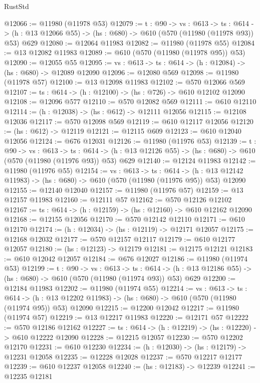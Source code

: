\begin{lexlean}{RustStd}
\begin{coremodule}
@12066 := @11980 (@11978 @53)
@12079 := {t : @90} ->
  {vs : @613} ->
  {ts : @614} -> (h : @13 @12066 @55) -> (hs : @680) -> @610 (@570 (@11980 (@11978 @93)) @53) @629
@12080 := @12064 @11983
@12082 := @11980 (@11978 @55)
@12084 := @13 @12082 @11983
@12089 := @610 (@570 (@11980 (@11978 @95)) @53)
@12090 := @12055 @55
@12095 := {vs : @613} -> {ts : @614} -> (h : @12084) -> (hs : @680) -> @12089 @12090
@12096 := @12080 @569
@12098 := @11980 (@11978 @57)
@12100 := @13 @12098 @11983
@12102 := @570 @12066 @569
@12107 := {ts : @614} -> (h : @12100) -> (hs : @726) -> @610 @12102 @12090
@12108 := @12096 @577
@12110 := @570 @12082 @569
@12111 := @610 @12110
@12114 := (h : @12038) -> (hs : @612) -> @12111 @12056
@12115 := @12108 @12036
@12117 := @570 @12098 @569
@12119 := @610 @12117 @12056
@12120 := (hs : @612) -> @12119
@12121 := @12115 @609
@12123 := @610 @12040 @12056
@12124 := @676 @12031
@12126 := @11980 (@11976 @53)
@12139 := {t : @90} ->
  {vs : @613} ->
  {ts : @614} -> (h : @13 @12126 @55) -> (hs : @680) -> @610 (@570 (@11980 (@11976 @93)) @53) @629
@12140 := @12124 @11983
@12142 := @11980 (@11976 @55)
@12154 := {vs : @613} ->
  {ts : @614} ->
  (h : @13 @12142 @11983) -> (hs : @680) -> @610 (@570 (@11980 (@11976 @95)) @53) @12090
@12155 := @12140 @12040
@12157 := @11980 (@11976 @57)
@12159 := @13 @12157 @11983
@12160 := @12111 @57
@12162 := @570 @12126 @12102
@12167 := {ts : @614} -> (h : @12159) -> (hs : @12160) -> @610 @12162 @12090
@12168 := @12155 @12056
@12170 := @570 @12142 @12110
@12171 := @610 @12170
@12174 := (h : @12034) -> (hs : @12119) -> @12171 @12057
@12175 := @12168 @12032
@12177 := @570 @12157 @12117
@12179 := @610 @12177 @12057
@12180 := (hs : @12123) -> @12179
@12181 := @12175 @12121
@12183 := @610 @12042 @12057
@12184 := @676 @12027
@12186 := @11980 (@11974 @53)
@12199 := {t : @90} ->
  {vs : @613} ->
  {ts : @614} -> (h : @13 @12186 @55) -> (hs : @680) -> @610 (@570 (@11980 (@11974 @93)) @53) @629
@12200 := @12184 @11983
@12202 := @11980 (@11974 @55)
@12214 := {vs : @613} ->
  {ts : @614} ->
  (h : @13 @12202 @11983) -> (hs : @680) -> @610 (@570 (@11980 (@11974 @95)) @53) @12090
@12215 := @12200 @12042
@12217 := @11980 (@11974 @57)
@12219 := @13 @12217 @11983
@12220 := @12171 @57
@12222 := @570 @12186 @12162
@12227 := {ts : @614} -> (h : @12219) -> (hs : @12220) -> @610 @12222 @12090
@12228 := @12215 @12057
@12230 := @570 @12202 @12170
@12231 := @610 @12230
@12234 := (h : @12030) -> (hs : @12179) -> @12231 @12058
@12235 := @12228 @12028
@12237 := @570 @12217 @12177
@12239 := @610 @12237 @12058
@12240 := (hs : @12183) -> @12239
@12241 := @12235 @12181

\end{coremodule}
\end{lexlean}
